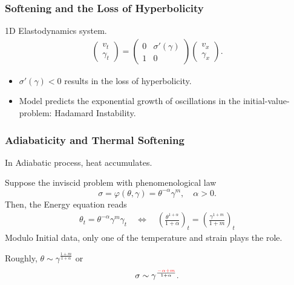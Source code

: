 \documentclass{beamer}
\def\red{\color{red}}
\def\blue{\color{blue}}
\begin{document}
\begin{frame}
 \frametitle{Softening and the Loss of Hyperbolicity}
 1D Elastodynamics system.
 \begin{align*}
  \begin{pmatrix}
   v_t\\ \gamma_t
  \end{pmatrix}
  = \begin{pmatrix}
   0 &\sigma'(\gamma)\\ 1 & 0
  \end{pmatrix} 
  \begin{pmatrix}
   v_x\\ \gamma_x
  \end{pmatrix}.
 \end{align*}
 \vfill
 \begin{itemize}
  \item $\sigma'(\gamma)<0$ results in the loss of hyperbolicity.
  \item Model predicts the exponential growth of oscillations in the initial-value-problem: {\blue Hadamard Instability}.
 \end{itemize}
\end{frame}

\begin{frame}
 \frametitle{Adiabaticity and Thermal Softening}
  In Adiabatic process, heat accumulates.  
  
  Suppose the inviscid problem with phenomenological law
 $$\sigma=\varphi(\theta,\gamma)=\theta^{-\alpha}\gamma^m, \quad \alpha>0.$$
 Then, the Energy equation reads
 \begin{align*}
  \theta_t = \theta^{-\alpha}\gamma^m\gamma_t \quad \Longleftrightarrow \quad 
  \left(\frac{\theta^{1+\alpha}}{1+\alpha}\right)_t = \left(\frac{\gamma^{1+m}}{1+m}\right)_t
 \end{align*}
 Modulo Initial data, only one of the temperature and strain plays the role.
 
 Roughly, $\theta\sim \gamma^{\frac{1+m}{1+\alpha}}$ or
 $$\sigma \sim \gamma^{\frac{\red-\alpha+m}{1+\alpha}}.$$
 \vfill
\end{frame}
\end{document}
